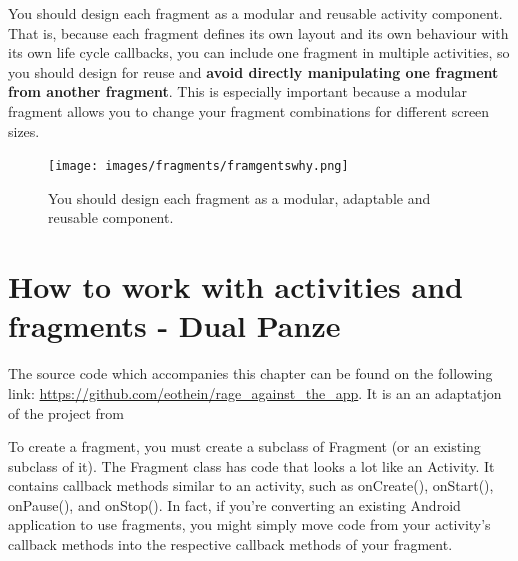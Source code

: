 You should design each fragment as a modular and reusable activity component. That is, because each fragment defines its own layout and its own behaviour with its own life cycle callbacks, you can include one fragment in multiple activities, so you should design for reuse and \textbf{avoid directly manipulating one fragment from another fragment}. This is especially important because a modular fragment allows you to change your fragment combinations for different screen sizes.

\begin{figure}
	\centering
	\texttt{[image: images/fragments/framgentswhy.png]}
	\label{fig:whyfragments}
	\caption{You should design each fragment as a modular, adaptable and reusable component.}
\end{figure}

\section{How to work with activities and fragments - Dual Panze}
\begin{framed}
	The source code which accompanies this chapter can be found on the following link: \url{https://github.com/eothein/rage_against_the_app}. It is an an adaptatjon of the project from \cite{Gleason2017a}

\end{framed}

To create a fragment, you must create a subclass of Fragment (or an existing subclass of it). The Fragment class has code that looks a lot like an Activity. It contains callback methods similar to an activity, such as onCreate(), onStart(), onPause(), and onStop(). In fact, if you're converting an existing Android application to use fragments, you might simply move code from your activity's callback methods into the respective callback methods of your fragment.

